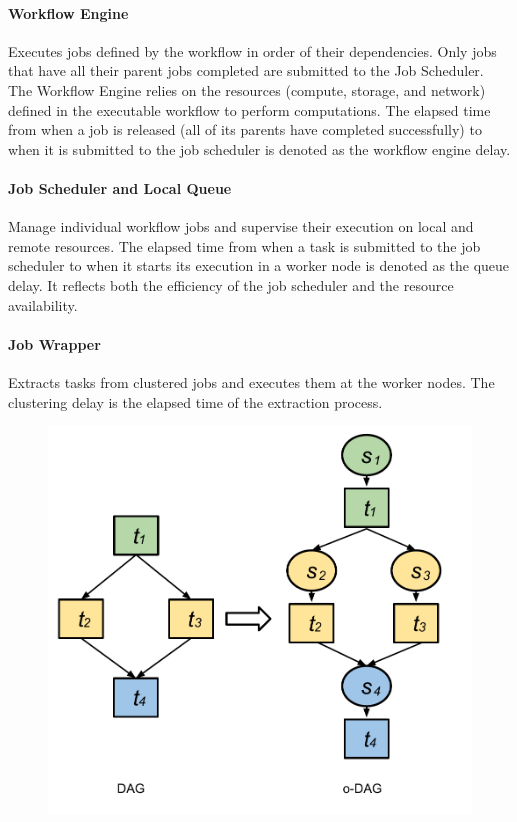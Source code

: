 \paragraph{Workflow Engine} Executes jobs defined by the workflow in order of their dependencies. Only jobs that have all their parent jobs completed are submitted to the Job Scheduler. The Workflow Engine relies on the resources (compute, storage, and network) defined in the executable workflow to perform computations. The elapsed time from when a job is released (all of its parents have completed successfully) to when it is submitted to the job scheduler is denoted as the workflow engine delay. %

\paragraph{Job Scheduler and Local Queue} Manage individual workflow jobs and supervise their execution on local and remote resources. The elapsed time from when a task is submitted to the job scheduler to when it starts its execution in a worker node is denoted as the queue delay. It reflects both the efficiency of the job scheduler and the resource availability. 

\paragraph{Job Wrapper} Extracts tasks from clustered jobs and executes them at the worker nodes. The clustering delay is the  elapsed time of the extraction process.

\begin{figure}[!htb]
	\centering
	\includegraphics[width=0.7\linewidth]{figure2.pdf}
	\label{fig:model_odag}
\end{figure}

